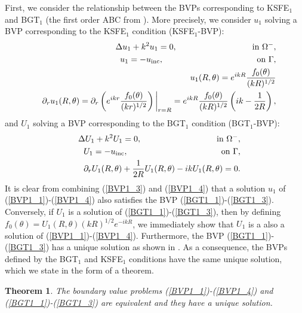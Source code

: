 \documentclass[final,3p,times,12pt]{elsarticle}
\newtheorem{Theorem}{Theorem}
\newcommand{\uinc}{u_{\rm inc}}
\begin{document}
First, we consider the relationship between the BVPs corresponding to KSFE$_{1}$ and BGT$_{1}$ (the first order ABC from \cite{Bayliss01}). More precisely, we consider $u_{1}$ solving a BVP corresponding to the 
KSFE$_1$ condition (KSFE$_1$-BVP):
\begin{eqnarray}
&& \Delta u_1+ k^2 u_1= 0, \qquad\qquad\qquad\quad\qquad  \text{in $\Omega^{-}$}, \label{BVP1_1} \\
&& u_1 = - \uinc, \quad\qquad\qquad\qquad\qquad\qquad\,  \text{on $\Gamma$,} \label{BVP1_2} \\
&& u_1(R,\theta)= e^{ikR}\frac{f_0(\theta)}{(kR)^{1/2}}\label{BVP1_3} \\
&&\partial_{r} u_1(R,\theta) = \partial_{r}\left(e^{ikr}\frac{f_0(\theta)}{(kr)^{1/2}}  \right) \bigg|_{r=R}=
 e^{ikR} \frac{f_{0}(\theta)}{(kR)^{1/2}}   \left(  ik  - \frac{1}{2R} \right),\label{BVP1_4} 
\end{eqnarray}
and $U_{1}$ solving a BVP corresponding to the BGT$_1$ condition (BGT$_1$-BVP):
\begin{eqnarray}
&& \Delta U_1+ k^2 U_1= 0, \qquad\qquad\qquad\quad\qquad  \text{in $\Omega^{-}$}, \label{BGT1_1} \\
&& U_1 = - \uinc, \quad\qquad\qquad\qquad\qquad\qquad\,  \text{on $\Gamma$,} \label{BGT1_2} \\
&& \partial_{r}U_1(R,\theta) + \frac{1}{2R}U_1(R,\theta) - ikU_1(R,\theta) = 0.\label{BGT1_3} 
\end{eqnarray}
It is clear from combining (\ref{BVP1_3}) and (\ref{BVP1_4}) that a solution $u_{1}$ of (\ref{BVP1_1})-(\ref{BVP1_4}) also
satisfies the BVP (\ref{BGT1_1})-(\ref{BGT1_3}). Conversely, if $U_1$ is a solution of (\ref{BGT1_1})-(\ref{BGT1_3}), then by defining $f_0(\theta)=U_1(R,\theta)(kR)^{1/2}e^{-ikR}$, we immediately show that $U_1$ is a also a solution of (\ref{BVP1_1})-(\ref{BVP1_4}). Furthermore, 
the BVP (\ref{BGT1_1})-(\ref{BGT1_3}) has a unique solution as shown in \cite{Bayliss01}. As a consequence, the BVPs defined by the BGT$_1$ and KSFE$_1$ conditions have the same unique solution, which we state in the form of a theorem.

\begin{Theorem} \label{Equiv1}
The boundary value problems (\ref{BVP1_1})-(\ref{BVP1_4}) and (\ref{BGT1_1})-(\ref{BGT1_3}) are equivalent and they have a unique solution.
\end{Theorem}
\end{document}
